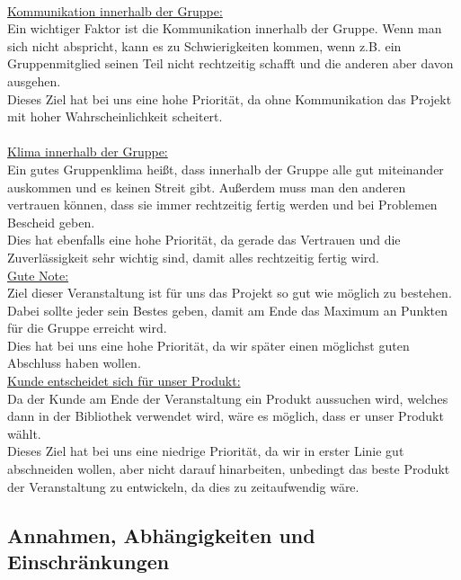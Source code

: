 \documentclass[fontsize=12pt,paper=a4,twoside]{scrartcl}
\begin{document}
\bigskip \\
\underline{Kommunikation innerhalb der Gruppe:} \\
Ein wichtiger Faktor ist die Kommunikation innerhalb der Gruppe. Wenn man sich nicht abspricht, kann es zu Schwierigkeiten kommen, wenn z.B. ein Gruppenmitglied seinen Teil nicht rechtzeitig schafft und die anderen aber davon ausgehen.\\
Dieses Ziel hat bei uns eine hohe Priorität, da ohne Kommunikation das Projekt mit hoher Wahrscheinlichkeit scheitert.\\
\bigskip \\
\underline{Klima innerhalb der Gruppe:} \\
Ein gutes Gruppenklima heißt, dass innerhalb der Gruppe alle gut miteinander auskommen und es keinen Streit gibt. Außerdem muss man den anderen vertrauen können, dass sie immer rechtzeitig fertig werden und bei Problemen Bescheid geben.\\
Dies hat ebenfalls eine hohe Priorität, da gerade das Vertrauen und die Zuverlässigkeit sehr wichtig sind, damit alles rechtzeitig fertig wird.
\bigskip \\
\underline{Gute Note:}\\
Ziel dieser Veranstaltung ist für uns das Projekt so gut wie möglich zu bestehen. Dabei sollte jeder sein Bestes geben, damit am Ende das Maximum an Punkten für die Gruppe erreicht wird.\\
Dies hat bei uns eine hohe Priorität, da wir später einen möglichst guten Abschluss haben wollen.
\bigskip \\
\underline{Kunde entscheidet sich für unser Produkt:}\\
Da der Kunde am Ende der Veranstaltung ein Produkt aussuchen wird, welches dann in der Bibliothek verwendet wird, wäre es möglich, dass er unser Produkt wählt.\\
Dieses Ziel hat bei uns eine niedrige Priorität, da wir in erster Linie gut abschneiden wollen, aber nicht darauf hinarbeiten, unbedingt das beste Produkt der Veranstaltung zu entwickeln, da dies zu zeitaufwendig wäre.


\subsection{Annahmen, Abhängigkeiten und Einschränkungen}
\end{document}
